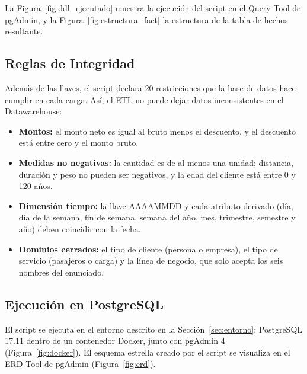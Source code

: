 La Figura~\ref{fig:ddl_ejecutado} muestra la ejecución del script en el Query
Tool de pgAdmin, y la Figura~\ref{fig:estructura_fact} la estructura de la
tabla de hechos resultante.


\subsection{Reglas de Integridad}

Además de las llaves, el script declara 20 restricciones  que la
base de datos hace cumplir en cada carga. Así, el ETL no puede dejar datos
inconsistentes en el Datawarehouse:

\begin{itemize}[leftmargin=*]
  \item \textbf{Montos:} el monto neto es igual al bruto menos el descuento, y
        el descuento está entre cero y el monto bruto.
  \item \textbf{Medidas no negativas:} la cantidad es de al menos una unidad;
        distancia, duración y peso no pueden ser negativos, y la edad del
        cliente está entre 0 y 120 años.
  \item \textbf{Dimensión tiempo:} la llave AAAAMMDD y cada atributo derivado
        (día, día de la semana, fin de semana, semana del año, mes, trimestre,
        semestre y año) deben coincidir con la fecha.
  \item \textbf{Dominios cerrados:} el tipo de cliente (persona o empresa), el
        tipo de servicio (pasajeros o carga) y la línea de negocio, que solo
        acepta los seis nombres del enunciado.
\end{itemize}

\subsection{Ejecución en PostgreSQL}

El script se ejecuta en el entorno descrito en la
Sección~\ref{sec:entorno}: PostgreSQL 17.11 dentro de un contenedor Docker,
junto con pgAdmin 4 (Figura~\ref{fig:docker}). El esquema estrella creado por
el script se visualiza en el ERD Tool de pgAdmin
(Figura~\ref{fig:erd}).

